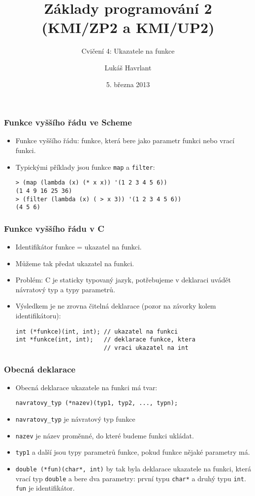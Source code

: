 \documentclass{beamer}
\title{Základy programování 2 (KMI/ZP2 a KMI/UP2)}
\subtitle{Cvičení 4: Ukazatele na funkce}
\author{Lukáš Havrlant}
\date{5. března 2013}
\institute{Univerzita Palackého}
\newenvironment{itemizex}%
  {\large \begin{itemize}%
    \setlength{\itemsep}{8pt}%
    \setlength{\parskip}{8pt}}%
  {\end{itemize}}
\newenvironment{itemizey}%
  {\large \begin{itemize}%
    \setlength{\itemsep}{6pt}%
    \setlength{\parskip}{6pt}}%
  {\end{itemize}}
\begin{document}
\begin{frame}[t,plain]
\titlepage
\end{frame}


\begin{frame}[t,fragile]\frametitle{Funkce vyššího řádu ve Scheme} 
    \begin{itemizex}
        \item Funkce vyššího řádu: funkce, která bere jako parametr funkci nebo vrací funkci.
        \item Typickými příklady jsou funkce \texttt{map} a \texttt{filter}:
\begin{verbatim} 
> (map (lambda (x) (* x x)) '(1 2 3 4 5 6))
(1 4 9 16 25 36)
> (filter (lambda (x) ( > x 3)) '(1 2 3 4 5 6))
(4 5 6)
\end{verbatim}
    \end{itemizex}
\end{frame}


\begin{frame}[t,fragile]\frametitle{Funkce vyššího řádu v C} 
    \begin{itemizex}
        \item Identifikátor funkce = ukazatel na funkci. 
        \item Můžeme tak předat ukazatel na funkci.
        \item Problém: C je staticky typovaný jazyk, potřebujeme v deklaraci uvádět návratový typ a typy parametrů. 
        \item Výsledkem je ne zrovna čitelná deklarace (pozor na závorky kolem identifikátoru):
\begin{verbatim} 
int (*funkce)(int, int); // ukazatel na funkci
int *funkce(int, int);   // deklarace funkce, ktera
                         // vraci ukazatel na int
\end{verbatim}
    \end{itemizex}
\end{frame}


\begin{frame}[t,fragile]\frametitle{Obecná deklarace} 
    \begin{itemizey}
        \item Obecná deklarace ukazatele na funkci má tvar:
\begin{verbatim} 
navratovy_typ (*nazev)(typ1, typ2, ..., typn);
\end{verbatim}
        \item \texttt{navratovy\_typ} je návratový typ funkce
        \item \texttt{nazev} je název proměnné, do které budeme funkci ukládat.
        \item \texttt{typ1} a další jsou typy parametrů funkce, pokud funkce nějaké parametry má. 
        \item \texttt{double (*fun)(char*, int)} by tak byla deklarace ukazatele na funkci, která vrací typ \texttt{double} a bere dva parametry: první typu \texttt{char*} a druhý typu \texttt{int}. \texttt{fun} je identifikátor. 
    \end{itemizey}
\end{frame}
\end{document}
